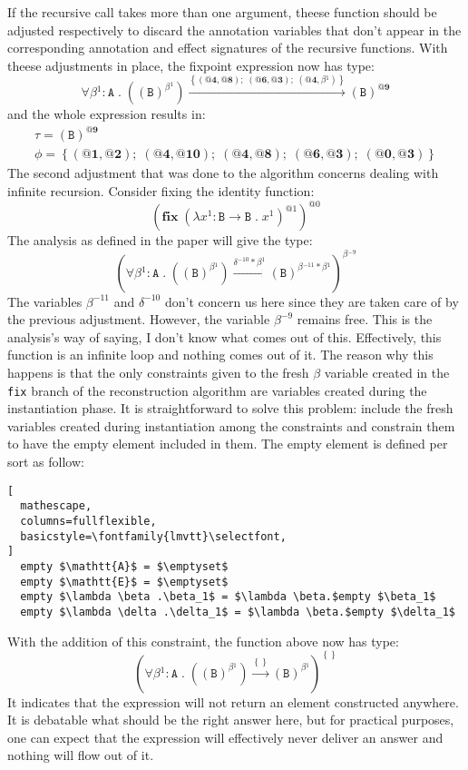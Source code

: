 \documentclass[8pt]{extarticle}
\begin{document}
If the recursive call takes more than one argument, theese function should be adjusted respectively to discard the annotation variables that don't appear in the corresponding annotation and effect signatures of the recursive functions. With theese adjustments in place, the fixpoint expression now has type:
\[
\forall{}\beta{}^{1}:\mathtt{A}\;{}.\;{}\left(\left(\mathtt{B}\right)^{\beta{}^{1}}\right)\xrightarrow{\left\{\left(\textbf{@4},\textbf{@8}\right);\;{}\left(\textbf{@6},\textbf{@3}\right);\;{}\left(\textbf{@4},\beta{}^{1}\right)\right\}}\left(\mathtt{B}\right)^{\textbf{@9}}
\]
and the whole expression results in:
\[
\begin{array}{c}
\tau=\left(\mathtt{B}\right)^{\textbf{@9}} \\
\phi=\left\{\left(\textbf{@1},\textbf{@2}\right);\;{}\left(\textbf{@4},\textbf{@10}\right);\;{}\left(\textbf{@4},\textbf{@8}\right);\;{}\left(\textbf{@6},\textbf{@3}\right);\;{}\left(\textbf{@0},\textbf{@3}\right)\right\}
\end{array}
\]
The second adjustment that was done to the algorithm concerns dealing with infinite recursion. Consider fixing the identity function:
\[
\left(\mathbf{fix}\;{}\left(\lambda{}x^{1}:\mathtt{B}\to{}\mathtt{B}\;{}.\;{}x^{1}\right)^{\mathit{@1}}\right)^{\mathit{@0}}
\]
The analysis as defined in the paper will give the type:
\[
\left(\forall{}\beta{}^{1}:\mathtt{A}\;{}.\;{}\left(\left(\mathtt{B}\right)^{\beta{}^{1}}\right)\xrightarrow{\delta{}^{-10}*\beta{}^{1}}\left(\mathtt{B}\right)^{\beta{}^{-11}*\beta{}^{1}}\right)^{\beta{}^{-9}}
\]
The variables $\beta^{-11}$ and $\delta^{-10}$ don't concern us here since they are taken care of by the previous adjustment. However, the variable $\beta^{-9}$ remains free. This is the analysis's way of saying, I don't know what comes out of this. Effectively, this function is an infinite loop and nothing comes out of it. The reason why this happens is that the only constraints given to the fresh $\beta$ variable created in the \verb+fix+ branch of the reconstruction algorithm are variables created during the instantiation phase. It is straightforward to solve this problem: include the fresh variables created during instantiation among the constraints and constrain them to have the empty element included in them. The empty element is defined per sort as follow:
\begin{lstlisting}[
  mathescape,
  columns=fullflexible,
  basicstyle=\fontfamily{lmvtt}\selectfont,
]
  empty $\mathtt{A}$ = $\emptyset$
  empty $\mathtt{E}$ = $\emptyset$
  empty $\lambda \beta .\beta_1$ = $\lambda \beta.$empty $\beta_1$
  empty $\lambda \delta .\delta_1$ = $\lambda \beta.$empty $\delta_1$
\end{lstlisting}
With the addition of this constraint, the function above now has type:
\[
\left(\forall{}\beta{}^{1}:\mathtt{A}\;{}.\;{}\left(\left(\mathtt{B}\right)^{\beta{}^{1}}\right)\xrightarrow{\left\{\right\}}\left(\mathtt{B}\right)^{\beta{}^{1}}\right)^{\left\{\right\}}
\]
It indicates that the expression will not return an element constructed anywhere. It is debatable what should be the right answer here, but for practical purposes, one can expect that the expression will effectively never deliver an answer and nothing will flow out of it.
\end{document}
